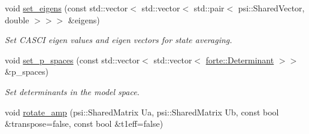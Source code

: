 \begin{DoxyCompactItemize}
void \mbox{\hyperlink{classforte_1_1_d_s_r_g___m_r_p_t2_a194b1229ce90c93816ebd247e03b6dd2}{set\+\_\+eigens}} (const std\+::vector$<$ std\+::vector$<$ std\+::pair$<$ psi\+::\+Shared\+Vector, double $>$$>$$>$ \&eigens)
\begin{DoxyCompactList}\small\item\em Set C\+A\+S\+CI eigen values and eigen vectors for state averaging. \end{DoxyCompactList}\item 
void \mbox{\hyperlink{classforte_1_1_d_s_r_g___m_r_p_t2_acc9e874503df77dab79c642ef381efe3}{set\+\_\+p\+\_\+spaces}} (const std\+::vector$<$ std\+::vector$<$ \mbox{\hyperlink{namespaceforte_a2076c63fd7b8732004d9e1442ce527c1}{forte\+::\+Determinant}} $>$$>$ \&p\+\_\+spaces)
\begin{DoxyCompactList}\small\item\em Set determinants in the model space. \end{DoxyCompactList}\item 
void \mbox{\hyperlink{classforte_1_1_d_s_r_g___m_r_p_t2_a1c002fd10dc32ed7486e20f8b9cf7cbd}{rotate\+\_\+amp}} (psi\+::\+Shared\+Matrix Ua, psi\+::\+Shared\+Matrix Ub, const bool \&transpose=false, const bool \&t1eff=false)
\end{DoxyCompactItemize}
